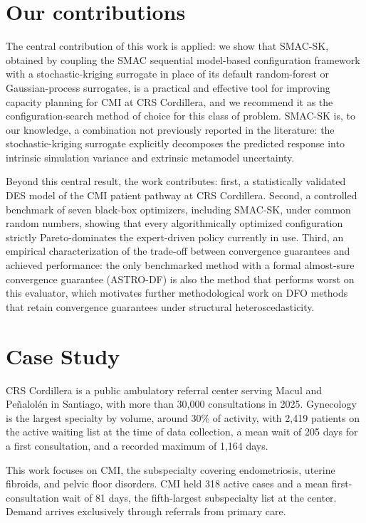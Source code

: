 \documentclass[11pt]{elsarticle}
\begin{document}
\section{Our contributions}

The central contribution of this work is applied: we show that SMAC-SK, obtained by coupling the SMAC sequential model-based configuration framework \citep{Lindauer2022,Hutter2011} with a stochastic-kriging surrogate \citep{Ankenman2010} in place of its default random-forest or Gaussian-process surrogates, is a practical and effective tool for improving capacity planning for CMI at CRS Cordillera, and we recommend it as the configuration-search method of choice for this class of problem. SMAC-SK is, to our knowledge, a combination not previously reported in the literature: the stochastic-kriging surrogate explicitly decomposes the predicted response into intrinsic simulation variance and extrinsic metamodel uncertainty.

Beyond this central result, the work contributes: first, a statistically validated DES model of the CMI patient pathway at CRS Cordillera. Second, a controlled benchmark of seven black-box optimizers, including SMAC-SK, under common random numbers, showing that every algorithmically optimized configuration strictly Pareto-dominates the expert-driven policy currently in use. Third, an empirical characterization of the trade-off between convergence guarantees and achieved performance: the only benchmarked method with a formal almost-sure convergence guarantee (ASTRO-DF) is also the method that performs worst on this evaluator, which motivates further methodological work on DFO methods that retain convergence guarantees under structural heteroscedasticity.


\section{Case Study}

CRS Cordillera is a public ambulatory referral center serving Macul and Peñalolén in Santiago, with more than 30{,}000 consultations in 2025. Gynecology is the largest specialty by volume, around 30\% of activity, with 2{,}419 patients on the active waiting list at the time of data collection, a mean wait of 205 days for a first consultation, and a recorded maximum of 1{,}164 days.

This work focuses on CMI, the subspecialty covering endometriosis, uterine fibroids, and pelvic floor disorders. CMI held 318 active cases and a mean first-consultation wait of 81 days, the fifth-largest subspecialty list at the center. Demand arrives exclusively through referrals from primary care.
\end{document}
